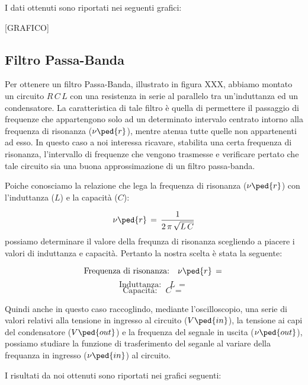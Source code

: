 I dati ottenuti sono riportati nei seguenti grafici:

[GRAFICO]

\subsection*{Filtro Passa-Banda}

Per ottenere un filtro Passa-Banda, illustrato in figura XXX, abbiamo montato un circuito $R\,C\,L$ con una resistenza in serie al parallelo tra un'induttanza ed un condensatore.
La caratteristica di tale filtro è quella di permettere il passaggio di frequenze che appartengono solo ad un determinato intervalo centrato intorno alla frequenza di risonanza ($\nu\ped{r}$), mentre atenua tutte quelle non appartenenti ad esso.
In questo caso a noi interessa ricavare, stabilita una certa frequenza di risonanza, l'intervallo di frequenze che vengono trasmesse e verificare pertato che tale circuito sia una buona approssimazione di un filtro passa-banda.

Poiche conosciamo la relazione che lega la frequenza di risonanza ($\nu\ped{r}$) con l'induttanza ($L$) e la capacità ($C$):

\begin{equation}
	\nu\ped{r} \,=\, \frac{1}{2\,\pi\,\sqrt{L\,C}}
	\label{eq:risonanza banda}
\end{equation}
%
possiamo determinare il valore della frequnza di risonanza scegliendo a piacere i valori di induttanza e capacità. Pertanto la nostra scelta è stata la seguente:

\begin{equation*}
	\text{Frequenza di risonanza:} \quad \nu\ped{r} \,=\,
\end{equation*}
\begin{equation*}
	\text{Induttanza:} \quad L \,=\,
\end{equation*}
\begin{equation*}
	\text{Capacità:} \quad C \,=\,
\end{equation*}

Quindi anche in questo caso raccoglindo, mediante l'oscilloscopio, una serie di valori relativi alla tensione in ingresso al circuito ($V\ped{in}$), la tensione ai capi del condensatore ($V\ped{out}$) e la frequenza del segnale in uscita ($\nu\ped{out}$), possiamo studiare la funzione di trasferimento del seganle al variare della frequanza in ingresso ($\nu\ped{in}$) al circuito.

I risultati da noi ottenuti sono riportati nei grafici seguenti:

